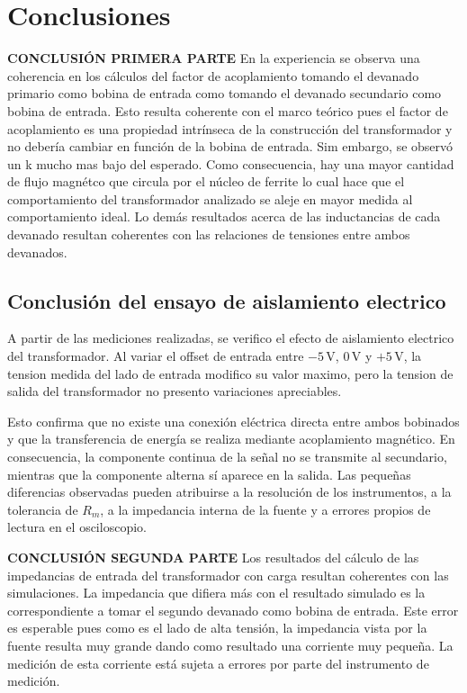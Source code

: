 \section{Conclusiones}
\textbf{CONCLUSIÓN PRIMERA PARTE}
En la experiencia se observa una coherencia en los cálculos del factor de acoplamiento tomando el devanado primario como bobina de entrada como tomando el devanado secundario como bobina de entrada. Esto resulta coherente con el marco teórico pues el factor de acoplamiento es una propiedad intrínseca de la construcción del transformador y no debería cambiar en función de la bobina de entrada. Sim embargo, se observó un k mucho mas bajo del esperado. Como consecuencia, hay una mayor cantidad de flujo magnétco que circula por el núcleo de ferrite lo cual hace que el comportamiento del transformador analizado se aleje en mayor medida al comportamiento ideal. Lo demás resultados acerca de las inductancias de cada devanado resultan coherentes con las relaciones de tensiones entre ambos devanados. 

\subsection{Conclusi\'on del ensayo de aislamiento electrico}

A partir de las mediciones realizadas, se verifico el efecto de aislamiento
electrico del transformador. Al variar el offset de entrada entre
\(-5\,\mathrm{V}\), \(0\,\mathrm{V}\) y \(+5\,\mathrm{V}\), la tension medida del
lado de entrada modifico su valor maximo, pero la tension de salida del
transformador no presento variaciones apreciables.

Esto confirma que no existe una conexi\'on el\'ectrica directa entre ambos
bobinados y que la transferencia de energ\'ia se realiza mediante acoplamiento
magn\'etico. En consecuencia, la componente continua de la se\~nal no se
transmite al secundario, mientras que la componente alterna s\'i aparece en la
salida. Las peque\~nas diferencias observadas pueden atribuirse a la resoluci\'on
de los instrumentos, a la tolerancia de \(R_m\), a la impedancia interna de la
fuente y a errores propios de lectura en el osciloscopio.

\textbf{CONCLUSIÓN SEGUNDA PARTE}
Los resultados del cálculo de las impedancias de entrada del transformador con carga resultan coherentes con las simulaciones. La impedancia que difiera más con el resultado simulado es la correspondiente a tomar el segundo devanado como bobina de entrada. Este error es esperable pues como es el lado de alta tensión, la impedancia vista por la fuente resulta muy grande dando como resultado una corriente muy pequeña. La medición de esta corriente está sujeta a errores por parte del instrumento de medición. 